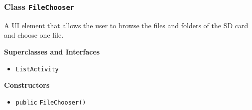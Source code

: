 \subsubsection{Class \lstinline|FileChooser|}
A UI element that allows the user to browse the files and folders of the SD card and
 choose one file. \\



\textbf{Superclasses and Interfaces}
\begin{itemize}
\item \lstinline|ListActivity|
\end{itemize}



\textbf{Constructors}
\begin{itemize}
\item \lstinline|public| \lstinline|FileChooser|\lstinline|()|




\end{itemize}


